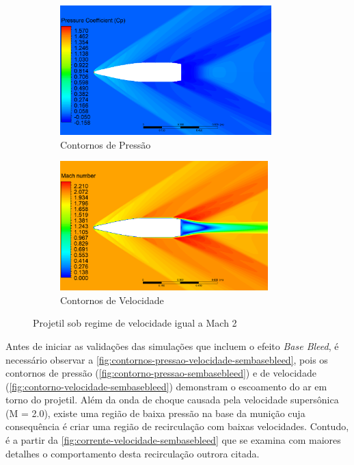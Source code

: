 \begin{figure}[!ht]
	\centering
	\begin{subfigure}[b]{0.47\textwidth}
        \centering
        \includegraphics[height=5cm,width=\textwidth]{contorno-pressao.png}
        \caption{Contornos de Pressão}
        \label{fig:contorno-pressao-sembasebleed}
    \end{subfigure}
    \hfill
	\begin{subfigure}[b]{0.47\textwidth}
        \centering
        \includegraphics[height=5cm,width=\textwidth]{contorno-velocidade.png}
        \caption{Contornos de Velocidade}
        \label{fig:contorno-velocidade-sembasebleed}
    \end{subfigure}
	\caption{Projetil sob regime de velocidade igual a Mach \num{2}}
	\label{fig:contornos-pressao-velocidade-sembasebleed}
\end{figure}

Antes de iniciar as validações das simulações que incluem o efeito \textit{Base Bleed}, é necessário observar a \autoref{fig:contornos-pressao-velocidade-sembasebleed}, pois os contornos de pressão (\autoref{fig:contorno-pressao-sembasebleed}) e de velocidade (\autoref{fig:contorno-velocidade-sembasebleed}) demonstram o escoamento do ar em torno do projetil. Além da onda de choque causada pela velocidade supersônica (M = \num{2,0}), existe uma região de baixa pressão na base da munição cuja consequência é criar uma região de recirculação com baixas velocidades. Contudo, é a partir da \autoref{fig:corrente-velocidade-sembasebleed} que se examina com maiores detalhes o comportamento desta recirculação outrora citada.

